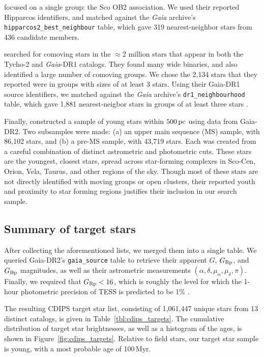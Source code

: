 \documentclass[12pt,twocolumn,tighten]{aastex62}
\begin{document}
\citet{rizzuto_multidimensional_2011} focused on a single group: the
Sco OB2 association. We used their reported Hipparcos identifiers, and
matched against the {\it Gaia} archive's
\texttt{hipparcos2\_best\_neighbour} table, which gave 319
nearest-neighbor stars from 436 candidate members.

\citet{oh_comoving_2017} searched for comoving stars in the $\approx$2
million stars that appear in both the Tycho-2 and {\it Gaia}-DR1
catalogs.  They found many wide binaries, and also identified a large
number of comoving groups.  We chose the 2{,}134 stars that they
reported were in groups with sizes of at least 3 stars.  Using their
Gaia-DR1 source identifiers, we matched against the {\it Gaia}
archive's \texttt{dr1\_neighbourhood} table, which gave 1{,}881
nearest-neigbor stars in groups of at least three stars
\citep{marrese_gaia_2019}.

Finally, \citet{zari_3d_2018} constructed a sample of young stars
within $500\,{\rm pc}$ using data from Gaia-DR2. Two subsamples were
made: (a) an upper main sequence (MS) sample, with 86{,}102 stars, and
(b) a pre-MS sample, with 43{,}719 stars.  Each was created from a
careful combination of distinct astrometric and photometric cuts.
These stars are the youngest, closest stars, spread across
star-forming complexes in Sco-Cen, Orion, Vela, Taurus, and other
regions of the sky.  Though most of these stars are not directly
identified with moving groups or open clusters, their reported youth
and proximity to star forming regions justifies their inclusion in our
search sample.



\subsection{Summary of target stars}
\label{subsec:ocmgsummary}


After collecting the aforementioned lists, we merged them into a
single table. We queried Gaia-DR2's \texttt{gaia\_source} table to
retrieve their apparent $G$, $G_{\rm Rp}$, and $G_{\rm Bp}$
magnitudes, as well as their astrometric measurements $(\alpha,
\delta, \mu_\alpha, \mu_\delta, \pi)$.  Finally, we required that
$G_{\rm Rp} < 16$, which is roughly the level for which the 1-hour
photometric precision of TESS is predicted to be 1\%
\citep{ricker_transiting_2015}.

The resulting CDIPS target star list, consisting of 1{,}061{,}447
unique stars from 13 distinct catalogs, is given in
Table~\ref{tbl:cdips_targets}.  The cumulative distribution of target
star brightnesses, as well as a histogram of the ages, is shown in
Figure~\ref{fig:cdips_targets}.  Relative to field stars, our target
star sample is young, with a most probable age of 100$\,$Myr.
\end{document}
